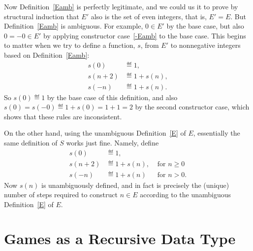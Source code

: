 \begin{definition}
\begin{staffnotes}
Now Definition~\ref{Eamb} is perfectly legitimate, and we could us it to
prove by structural induction that $E'$ also is the set of even integers,
that is, $E'= E$.  But Definition~\ref{Eamb} is ambiguous.  For example,
$0\in E'$ by the base case, but also $0=-0 \in E'$ by applying constructor
case~\ref{-Eamb} to the base case.  This begins to matter when we try to
define a function, $s$, from $E'$ to nonnegative integers based on
Definition~\ref{Eamb}:
\begin{align*}
  s(0) & \eqdef 1,\\
s(n+2) & \eqdef 1+ s(n),\\
 s(-n) & \eqdef 1+ s(n).
\end{align*}
So $s(0) \eqdef 1$ by the base case of this definition, and also $s(0)=
s(-0) \eqdef 1+s(0) = 1 + 1 = 2$ by the second constructor case, which
shows that these rules are inconsistent.

On the other hand, using the unambiguous Definition~\ref{E} of $E$,
essentially the same definition of $S$ works just fine.  Namely, define
\begin{align*}
  s(0) & \eqdef 1,\\
  s(n+2) & \eqdef 1+ s(n), & \text{ for } n \geq 0\\
  s(-n) & \eqdef 1+ s(n) & \text{ for } n > 0.
\end{align*}
Now $s(n)$ is unambiguously defined, and in fact is precisely the (unique)
number of steps required to construct $n \in E$ according to the
unambiguous Definition~\ref{E} of $E$.

\end{staffnotes}


\begin{problems}

\practiceproblems
{}

\classproblems
{}

\homeworkproblems
{}

\end{problems}

\section{Games as a Recursive Data Type}


\end{definition}
